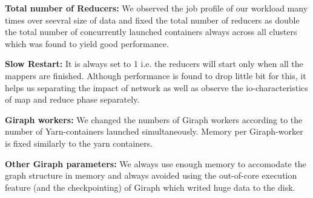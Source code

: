 \documentclass[conference]{IEEEtran}
\begin{document}
\textbf{Total number of Reducers:} We observed the job profile of our workload many times over seevral size of data and fixed the total number of reducers as double the total number of concurrently launched containers always across all clusters which was found to yield good performance. 

\textbf{Slow Restart:} It is always set to 1 i.e. the reducers will start only when all the mappers are finished. Although performance is found to drop little bit for this, it helps us separating the impact of network as well as observe the io-characteristics of map and reduce phase separately.

\textbf{Giraph workers:} We changed the numbers of Giraph workers according to the number of Yarn-containers launched simultaneously. Memory per Giraph-worker is fixed similarly to the yarn containers.

\textbf{Other Giraph parameters:} We always use enough memory to accomodate the graph structure in memory and always avoided using the out-of-core execution feature (and the checkpointing) of Giraph which writed huge data to the disk.
\end{document}
